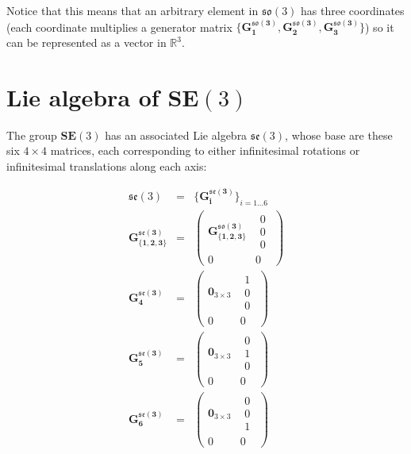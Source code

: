 \documentclass[a4paper,11pt]{report}
\begin{document}
Notice that this means that an arbitrary element in $\mathfrak{so}(3)$ 
has three coordinates (each coordinate multiplies a generator 
matrix $\{  \mathbf{G^{\mathfrak{so}(3)}_1}, \mathbf{G^{\mathfrak{so}(3)}_2}, \mathbf{G^{\mathfrak{so}(3)}_3} \}$) so it can 
be represented as a vector in $\mathbb{R}^3$.


\section{Lie algebra of $\mathbf{SE}(3)$}

The group $\mathbf{SE}(3)$ has an associated Lie algebra $\mathfrak{se}(3)$, 
whose base are these six $4 \times 4$ matrices, each corresponding to 
either infinitesimal rotations or infinitesimal translations along each axis:

\begin{eqnarray}
\mathfrak{se}(3) &=& \{  \mathbf{G^{\mathfrak{se}(3)}_i} \}_{i=1...6}  \\
\mathbf{G^{\mathfrak{se}(3)}_{\{1,2,3\}} } &=& 
\left(
\begin{array}{c|c}
 \mathbf{G^{\mathfrak{so}(3)}_{\{1,2,3\}} } & \begin{array}{c} 0 \\0 \\0 \end{array} \\
\hline    0 & 0
\end{array}
\right) 
\\
\mathbf{G^{\mathfrak{se}(3)}_4 } &=& 
\left(
\begin{array}{c|c}
 \mathbf{0}_{3\times 3} & \begin{array}{c} 1 \\0 \\0 \end{array} \\
\hline    0 & 0
\end{array}
\right) 
\\
\mathbf{G^{\mathfrak{se}(3)}_5 } &=& 
\left(
\begin{array}{c|c}
 \mathbf{0}_{3\times 3} & \begin{array}{c} 0 \\1 \\0 \end{array} \\
\hline    0 & 0
\end{array}
\right) 
\\
\mathbf{G^{\mathfrak{se}(3)}_6 } &=& 
\left(
\begin{array}{c|c}
 \mathbf{0}_{3\times 3} & \begin{array}{c} 0 \\0 \\1 \end{array} \\
\hline    0 & 0
\end{array}
\right)
\end{eqnarray} 
\end{document}
